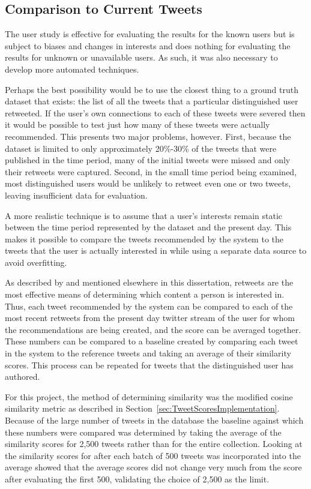 \subsection{Comparison to Current Tweets}
\label{sec:ComparisonToCurrentTweets}

The user study is effective for evaluating the results for the known users but is subject to biases and changes in interests and does nothing for evaluating the results for unknown or unavailable users. As such, it was also necessary to develop more automated techniques.

Perhaps the best possibility would be to use the closest thing to a ground truth dataset that exists: the list of all the tweets that a particular distinguished user retweeted. If the user's own connections to each of these tweets were severed then it would be possible to test just how many of these tweets were actually recommended. This presents two major problems, however. First, because the dataset is limited to only approximately 20\%-30\% of the tweets that were published in the time period, many of the initial tweets were missed and only their retweets were captured. Second, in the small time period being examined, most distinguished users would be unlikely to retweet even one or two tweets, leaving insufficient data for evaluation.

A more realistic technique is to assume that a user's interests remain static between the time period represented by the dataset and the present day. This makes it possible to compare the tweets recommended by the system to the tweets that the user is actually interested in while using a separate data source to avoid overfitting.

As described by \cite{Welch2011} and mentioned elsewhere in this dissertation, retweets are the most effective means of determining which content a person is interested in. Thus, each tweet recommended by the system can be compared to each of the most recent retweets from the present day twitter stream of the user for whom the recommendations are being created, and the score can be averaged together. These numbers can be compared to a baseline created by comparing each tweet in the system to the reference tweets and taking an average of their similarity scores. This process can be repeated for tweets that the distinguished user has authored.

For this project, the method of determining similarity was the modified cosine similarity metric as described in Section~\ref{sec:TweetScoresImplementation}. Because of the large number of tweets in the database the baseline against which these numbers were compared was determined by taking the average of the similarity scores for 2,500 tweets rather than for the entire collection. Looking at the similarity scores for after each batch of 500 tweets was incorporated into the average showed that the average scores did not change very much from the score after evaluating the first 500, validating the choice of 2,500 as the limit.

